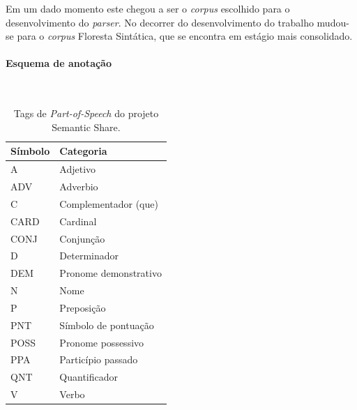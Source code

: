 Em um dado momento este chegou a ser o \emph{corpus} escolhido para o desenvolvimento do \emph{parser}. No decorrer do desenvolvimento do trabalho mudou-se para o \emph{corpus} Floresta Sintática, que se encontra em estágio mais consolidado.

\paragraph{Esquema de anotação}\label{sub:semantic_anotacao}\hspace*{1in}\\


\begin{table}[H]

   \centering
   \small
   \caption{ Tags de \emph{Part-of-Speech} do projeto Semantic Share.}

    \begin{tabular}{ | p{3cm} | p{10cm} | }
      \hline
        \textbf{Símbolo} & \textbf{Categoria}\\
        \hline
        \hline

    A&Adjetivo\\
    \hline
    ADV&Adverbio\\
    \hline
    C&Complementador (que)\\
    \hline
    CARD&Cardinal\\
    \hline
    CONJ&Conjunção\\
    \hline
    D&Determinador\\
    \hline
    DEM&Pronome demonstrativo\\
    \hline
    N&Nome\\
    \hline
    P&Preposição\\
    \hline
    PNT&Símbolo de pontuação\\
    \hline
    POSS&Pronome possessivo\\
    \hline
    PPA&Particípio passado\\
    \hline
    QNT& Quantificador\\
    \hline
    V& Verbo\\
    \hline


   \end{tabular}
\label{tbl:semantic_share_pos}      
\end{table}


